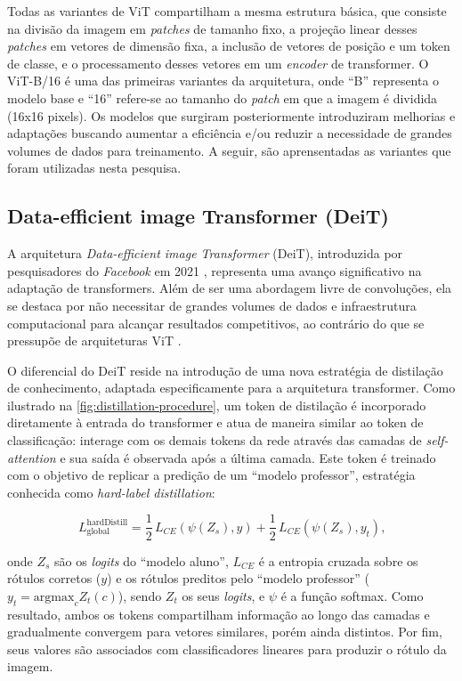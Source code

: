 Todas as variantes de ViT compartilham a mesma estrutura básica, que consiste na divisão da imagem em \textit{patches} de tamanho fixo, a projeção linear desses \textit{patches} em vetores de dimensão fixa, a inclusão de vetores de posição e um token de classe, e o processamento desses vetores em um \textit{encoder} de transformer. O ViT-B/16 \citep{Dosovitskiy2021} é uma das primeiras variantes da arquitetura, onde ``B'' representa o modelo base e ``16'' refere-se ao tamanho do \textit{patch} em que a imagem é dividida (16x16 pixels). Os modelos que surgiram posteriormente introduziram melhorias e adaptações buscando aumentar a eficiência e/ou reduzir a necessidade de grandes volumes de dados para treinamento. A seguir, são aprensentadas as variantes que foram utilizadas nesta pesquisa.

\subsection{Data-efficient image Transformer (DeiT)}

A arquitetura \textit{Data-efficient image Transformer} (DeiT), introduzida por pesquisadores do \textit{Facebook} em 2021 \citep{Touvron2021}, representa uma avanço significativo na adaptação de transformers. Além de ser uma abordagem livre de convoluções, ela se destaca por não necessitar de grandes volumes de dados e infraestrutura computacional para alcançar resultados competitivos, ao contrário do que se pressupõe de arquiteturas ViT \citep{Dosovitskiy2021}.

O diferencial do DeiT reside na introdução de uma nova estratégia de distilação de conhecimento, adaptada especificamente para a arquitetura transformer. Como ilustrado na \autoref{fig:distillation-procedure}, um token de distilação é incorporado diretamente à entrada do transformer e atua de maneira similar ao token de classificação: interage com os demais tokens da rede através das camadas de \textit{self-attention} e sua saída é observada após a última camada. Este token é treinado com o objetivo de replicar a predição de um ``modelo professor'', estratégia conhecida como \textit{hard-label distillation}:

\begin{equation}
    L_{\text{global}}^{\text{hardDistill}} = \frac{1}{2} \, L_{CE}\left( \psi(Z_s), y \right) + \frac{1}{2} \, L_{CE}\left( \psi(Z_s), y_t \right) \text{,}
\end{equation}

onde $Z_s$ são os \textit{logits} do ``modelo aluno'', $L_{CE}$ é a entropia cruzada sobre os rótulos corretos ($y$) e os rótulos preditos pelo ``modelo professor'' ($y_t = \text{argmax}_c Z_t(c)$), sendo $Z_t$ os seus \textit{logits}, e $\psi$ é a função softmax. Como resultado, ambos os tokens compartilham informação ao longo das camadas e gradualmente convergem para vetores similares, porém ainda distintos. Por fim, seus valores são associados com classificadores lineares para produzir o rótulo da imagem.


